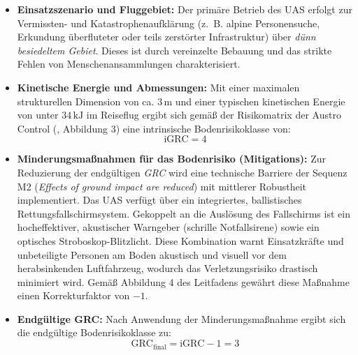 \begin{itemize}
    \item \textbf{Einsatzszenario und Fluggebiet:} Der primäre Betrieb des UAS erfolgt zur Vermissten- und Katastrophenaufklärung (z.~B. alpine Personensuche, Erkundung überfluteter oder teils zerstörter Infrastruktur) 
                                                   über \textit{dünn besiedeltem Gebiet}. Dieses ist durch vereinzelte Bebauung und das strikte Fehlen von Menschenansammlungen charakterisiert.
    \item \textbf{Kinetische Energie und Abmessungen:} Mit einer maximalen strukturellen Dimension von ca. $3\,\text{m}$ und einer typischen kinetischen Energie von unter $34\,\text{kJ}$ 
                                                       im Reiseflug ergibt sich gemäß der Risikomatrix der Austro Control (\cite{austrocontrol_sora}, Abbildung 3) eine intrinsische Bodenrisikoklasse von:
    \begin{equation}
        \text{iGRC} = 4
    \end{equation}
    \item \textbf{Minderungsmaßnahmen für das Bodenrisiko (Mitigations):} Zur Reduzierung der endgültigen \textit{GRC} wird eine technische Barriere der Sequenz M2 
                                                                          (\textit{Effects of ground impact are reduced}) mit mittlerer Robustheit implementiert. Das UAS verfügt über ein integriertes, ballistisches Rettungsfallschirmsystem. 
                                                                          Gekoppelt an die Auslösung des Fallschirms ist ein hocheffektiver, akustischer Warngeber (schrille Notfallsirene) sowie ein optisches Stroboskop-Blitzlicht. 
                                                                          Diese Kombination warnt Einsatzkräfte und unbeteiligte Personen am Boden akustisch und visuell vor dem herabsinkenden Luftfahrzeug, 
                                                                          wodurch das Verletzungsrisiko drastisch minimiert wird. Gemäß Abbildung 4 des Leitfadens \cite{austrocontrol_sora} gewährt diese Maßnahme einen Korrekturfaktor von $-1$.
    \item \textbf{Endgültige GRC:} Nach Anwendung der Minderungsmaßnahme ergibt sich die endgültige Bodenrisikoklasse zu:
    \begin{equation}
        \text{GRC}_{\text{final}} = \text{iGRC} - 1 = 3
    \end{equation}
\end{itemize}

